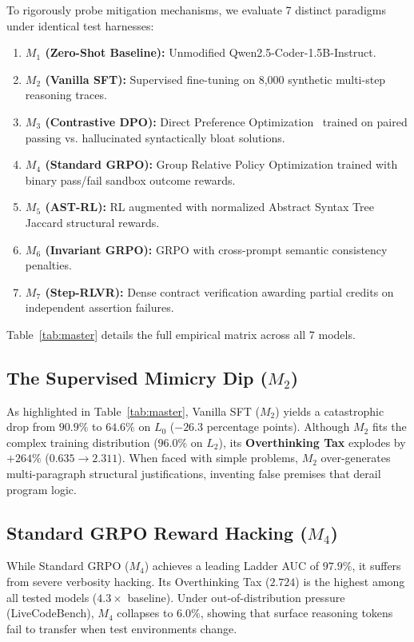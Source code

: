 \documentclass[10pt,twocolumn,letterpaper]{article}
\begin{document}
To rigorously probe mitigation mechanisms, we evaluate 7 distinct paradigms under identical test harnesses:
\begin{enumerate}[leftmargin=*]
    \item \textbf{$M_1$ (Zero-Shot Baseline):} Unmodified Qwen2.5-Coder-1.5B-Instruct.
    \item \textbf{$M_2$ (Vanilla SFT):} Supervised fine-tuning on 8,000 synthetic multi-step reasoning traces.
    \item \textbf{$M_3$ (Contrastive DPO):} Direct Preference Optimization~\cite{rafailov2024direct} trained on paired passing vs. hallucinated syntactically bloat solutions.
    \item \textbf{$M_4$ (Standard GRPO):} Group Relative Policy Optimization trained with binary pass/fail sandbox outcome rewards.
    \item \textbf{$M_5$ (AST-RL):} RL augmented with normalized Abstract Syntax Tree Jaccard structural rewards.
    \item \textbf{$M_6$ (Invariant GRPO):} GRPO with cross-prompt semantic consistency penalties.
    \item \textbf{$M_7$ (Step-RLVR):} Dense contract verification awarding partial credits on independent assertion failures.
\end{enumerate}

Table~\ref{tab:master} details the full empirical matrix across all 7 models.

\subsection{The Supervised Mimicry Dip ($M_2$)}
As highlighted in Table~\ref{tab:master}, Vanilla SFT ($M_2$) yields a catastrophic drop from $90.9\%$ to $64.6\%$ on $L_0$ ($-26.3$ percentage points). Although $M_2$ fits the complex training distribution ($96.0\%$ on $L_2$), its \textbf{Overthinking Tax} explodes by $+264\%$ ($0.635 \rightarrow 2.311$). When faced with simple problems, $M_2$ over-generates multi-paragraph structural justifications, inventing false premises that derail program logic.

\subsection{Standard GRPO Reward Hacking ($M_4$)}
While Standard GRPO ($M_4$) achieves a leading Ladder AUC of $97.9\%$, it suffers from severe verbosity hacking. Its Overthinking Tax ($2.724$) is the highest among all tested models ($4.3\times$ baseline). Under out-of-distribution pressure (LiveCodeBench), $M_4$ collapses to $6.0\%$, showing that surface reasoning tokens fail to transfer when test environments change.
\end{document}
